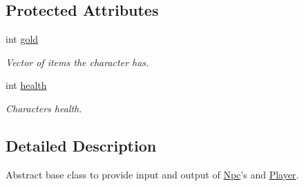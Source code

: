 \subsection*{Protected Attributes}
\begin{DoxyCompactItemize}
\item 
int \hyperlink{classCharacter_ab8dd866071dba429a35555e0c372e162}{gold}
\begin{DoxyCompactList}\small\item\em Vector of items the character has. \end{DoxyCompactList}\item 
\hypertarget{classCharacter_a69c649b8febd22729e6edafb27e69aeb}{int \hyperlink{classCharacter_a69c649b8febd22729e6edafb27e69aeb}{health}}\label{classCharacter_a69c649b8febd22729e6edafb27e69aeb}

\begin{DoxyCompactList}\small\item\em Characters health. \end{DoxyCompactList}\end{DoxyCompactItemize}


\subsection{Detailed Description}
Abstract base class to provide input and output of \hyperlink{classNpc}{Npc}'s and \hyperlink{classPlayer}{Player}. 


